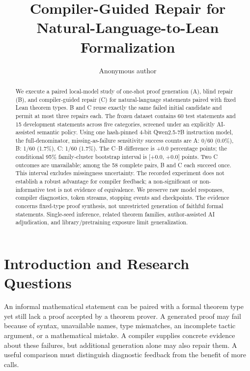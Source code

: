 \documentclass[runningheads,a4paper]{llncs}
\begin{document}
\title{Compiler-Guided Repair for Natural-Language-to-Lean Formalization}
\author{Anonymous author}
\maketitle

\begin{abstract}
We execute a paired local-model study of one-shot proof generation (A), blind
repair (B), and compiler-guided repair (C) for natural-language statements
paired with fixed Lean theorem types. B and C reuse exactly the same failed
initial candidate and permit at most three repairs each. The frozen dataset
contains 60 test statements and 15 development statements across five
categories, screened under an explicitly AI-assisted semantic policy.
Using one hash-pinned 4-bit Qwen2.5-7B instruction model, the full-denominator, missing-as-failure sensitivity
success counts are A: 0/60 (0.0\%), B: 1/60 (1.7\%), C: 1/60 (1.7\%). The C--B difference is +0.0 percentage points;
the conditional 95\% family-cluster bootstrap interval is [+0.0, +0.0] points. Two C outcomes are unavailable; among the 58 complete pairs, B and C each succeed once. This interval excludes missingness uncertainty.
The recorded experiment does not establish a robust advantage for compiler feedback; a non-significant or non-informative test is not evidence of equivalence. We preserve raw model responses, compiler diagnostics, token
streams, stopping events and checkpoints. The evidence concerns fixed-type
proof synthesis, not unrestricted generation of faithful formal statements.
Single-seed inference, related theorem families, author-assisted AI adjudication,
and library/pretraining exposure limit generalization.
\end{abstract}

\section{Introduction and Research Questions}
An informal mathematical statement can be paired with a formal theorem type
yet still lack a proof accepted by a theorem prover. A generated proof may fail
because of syntax, unavailable names, type mismatches, an incomplete tactic
argument, or a mathematical mistake. A compiler supplies concrete evidence about
these failures, but additional generation alone may also repair them. A useful
comparison must distinguish diagnostic feedback from the benefit of more calls.
\end{document}
